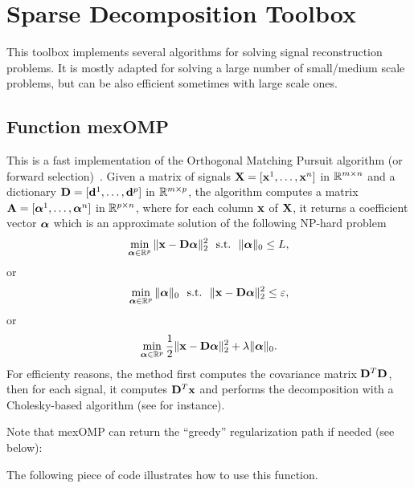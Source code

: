 \documentclass[a4paper, 11pt]{article}
\begin{document}
\section{Sparse Decomposition Toolbox}
This toolbox implements several algorithms for solving signal reconstruction problems. It is mostly adapted for solving a large number of small/medium scale problems, but can be also efficient sometimes with large scale ones.
\subsection{Function mexOMP}
This is a fast implementation of the Orthogonal Matching Pursuit algorithm (or forward selection)~\cite{mallat4,weisberg}. Given a matrix of signals ${\mathbf X}=[{\mathbf x}^1,\ldots,{\mathbf x}^n]$  in ${\mathbb R}^{m \times n}$ and a dictionary ${\mathbf D}=[{\mathbf d}^1,\ldots,{\mathbf d}^p]$ in ${\mathbb R}^{m \times p}$, the algorithm computes a matrix ${\mathbf A}=[{\boldsymbol\alpha}^1,\ldots,{\boldsymbol\alpha}^n]$ in ${\mathbb R}^{p \times n}$,
     where for each column ${\mathbf x}$ of ${\mathbf X}$, it returns a coefficient vector ${\boldsymbol\alpha}$ which is an approximate solution of the following NP-hard problem
     \begin{equation}
     \min_{{\boldsymbol\alpha} \in {\mathbb R}^p} \|{\mathbf x}-{\mathbf D}{\boldsymbol\alpha}\|_2^2 ~~\text{s.t.}~~ \|{\boldsymbol\alpha}\|_0 \leq L,
     \end{equation}
     or
     \begin{equation}
     \min_{{\boldsymbol\alpha} \in {\mathbb R}^p}  \|{\boldsymbol\alpha}\|_0 ~~\text{s.t.}~~ \|{\mathbf x}-{\mathbf D}{\boldsymbol\alpha}\|_2^2 \leq \varepsilon,
     \end{equation}
     or
     \begin{equation}
     \min_{{\boldsymbol\alpha} \in {\mathbb R}^p} \frac{1}{2}\|{\mathbf x}-{\mathbf D}{\boldsymbol\alpha}\|_2^2 + \lambda \|{\boldsymbol\alpha}\|_0.
     \end{equation}
     For efficienty reasons, the method first computes the covariance matrix
     ${\mathbf D}^T{\mathbf D}$, then for each signal, it computes ${\mathbf D}^T{\mathbf x}$ and performs the
     decomposition with a Cholesky-based algorithm (see \cite{cotter} for instance).

     Note that mexOMP can return the ``greedy'' regularization path if needed (see below):

The following piece of code illustrates how to use this function.

\end{document}

